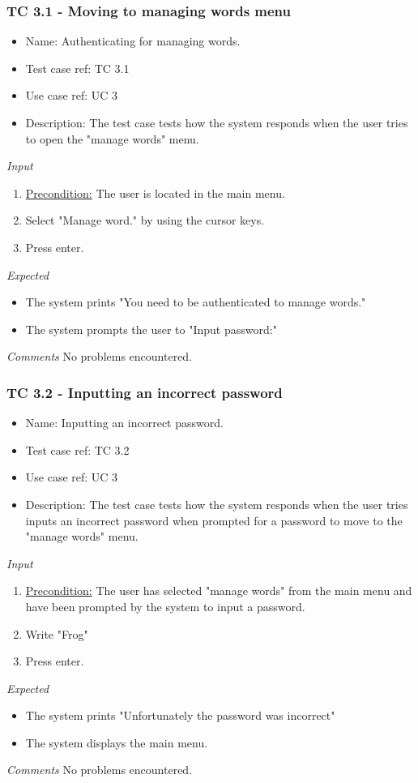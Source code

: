 \documentclass[12pt, letterpaper]{article}
\begin{document}
\subsubsection{TC 3.1 - Moving to managing words menu}
\begin{itemize}
	\item Name: Authenticating for managing words.
	\item Test case ref: TC 3.1
	\item Use case ref: UC 3
	\item Description: The test case tests how the system responds when the user tries to open the "manage words" menu.
\end{itemize}
\emph{Input}
\begin{enumerate}
	\item \underline{Precondition:} The user is located in the main menu.
	\item Select "Manage word." by using the cursor keys.
	\item Press enter.
\end{enumerate}
\emph{Expected}
\begin{itemize}
	\item The system prints "You need to be authenticated to manage words."
	\item The system prompts the user to "Input password:"
\end{itemize}
\emph{Comments}
No problems encountered.
\subsubsection{TC 3.2 - Inputting an incorrect password}
\begin{itemize}
	\item Name: Inputting an incorrect password.
	\item Test case ref: TC 3.2
	\item Use case ref: UC 3
	\item Description: The test case tests how the system responds when the user tries inputs an incorrect password when prompted for a password to move to the "manage words" menu.
\end{itemize}
\emph{Input}
\begin{enumerate}
	\item \underline{Precondition:} The user has selected "manage words" from the main menu and have been prompted by the system to input a password.
	\item Write "Frog"
	\item Press enter.
\end{enumerate}
\emph{Expected}
\begin{itemize}
	\item The system prints "Unfortunately the password was incorrect"
	\item The system displays the main menu.
\end{itemize}
\emph{Comments}
No problems encountered.
\end{document}
